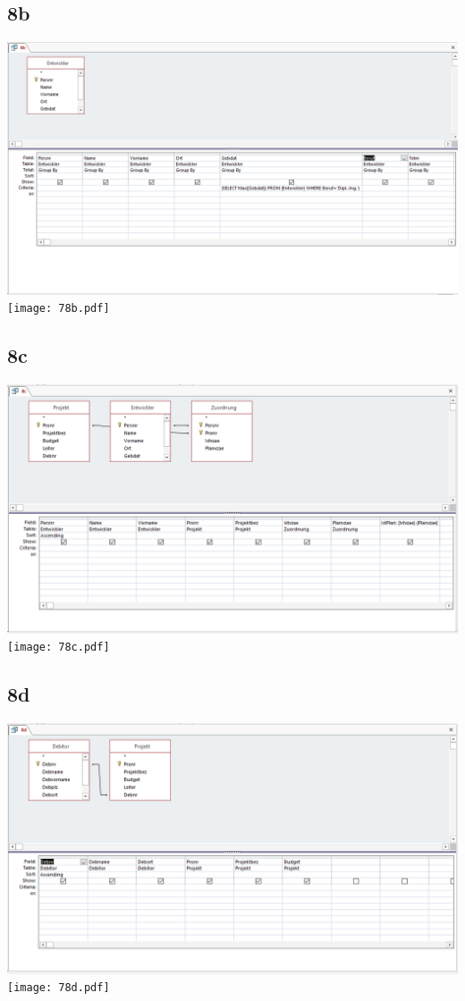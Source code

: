 \subsection{8b}
\includegraphics[width=.98\columnwidth]{78b.PNG}\\
\texttt{[image: 78b.pdf]}
\subsection{8c}
\includegraphics[width=.98\columnwidth]{78c.PNG}\\
\texttt{[image: 78c.pdf]}
\subsection{8d}
\includegraphics[width=.98\columnwidth]{78d.PNG}\\
\texttt{[image: 78d.pdf]}
